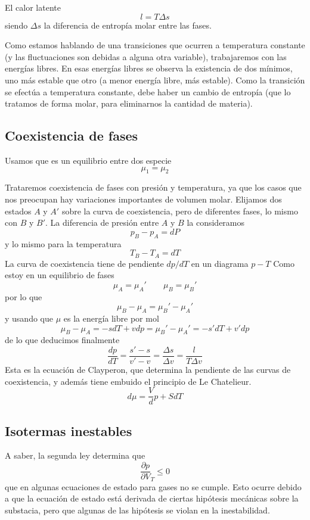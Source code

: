 \documentclass{book}
\numberwithin{equation}{section} %
\begin{document}
El calor latente
\begin{equation}
l = T \Delta s
\end{equation}
siendo $\Delta s$ la diferencia de entropía molar entre las fases.

Como estamos hablando de una transiciones que ocurren a temperatura constante (y las fluctuaciones son debidas a alguna otra variable), trabajaremos con las energías libres.
En esas energías libres se observa la existencia de dos mínimos, uno más estable que otro (a menor energía libre, más estable).
Como la transición se efectúa a temperatura constante, debe haber un cambio de entropía (que lo tratamos de forma molar, para eliminarnos la cantidad de materia).
\subsection{Coexistencia de fases}
Usamos que es un equilibrio entre dos especie
\[\mu_{1} = \mu_{2}\]

Trataremos coexistencia de fases con presión y temperatura, ya que los casos que nos preocupan hay variaciones importantes de volumen molar.
Elijamos dos estados $A$ y $A'$ sobre la curva de coexistencia, pero de diferentes fases, lo mismo con $B$ y $B'$.
La diferencia de presión entre $A$ y $B$ la consideramos
\[p_B - p_A = dP\]
y lo mismo para la temperatura
\[T_B - T_A = dT\]
La curva de coexistencia tiene de pendiente $dp/dT$ en un diagrama $p-T$
Como estoy en un equilibrio de fases
\[\mu_A = \mu_A' \qquad \mu_B = \mu_B'\]
por lo que
\[\mu_B - \mu_A = \mu_B' - \mu_A'\]
y usando que $\mu$ es la energía libre por mol
\[\mu_B - \mu_A = -s dT + v dp = \mu_B' - \mu_A' = -s' dT + v' dp\]
de lo que deducimos finalmente
\begin{equation}
    \frac{dp}{dT} = \frac{s' - s}{v' - v} = \frac{\Delta s}{\Delta v} = \frac{l}{T \Delta v}
    \label{eq:clausius_clayperon}
\end{equation}
Esta es la ecuación de Clayperon, que determina la pendiente de las curvas de coexistencia, y además tiene embuido el principio de Le Chatelieur.
\[d\mu = \frac{V} dp + S dT\]

\subsection{Isotermas inestables}

A saber, la segunda ley determina que
\[ \frac{\partial p}{\partial V}_T \leq 0\]
que en algunas ecuaciones de estado para gases no se cumple.
Esto ocurre debido a que la ecuación de estado está derivada de ciertas hipótesis mecánicas sobre la substacia, pero que algunas de las hipótesis se violan en la inestabilidad.
\end{document}
